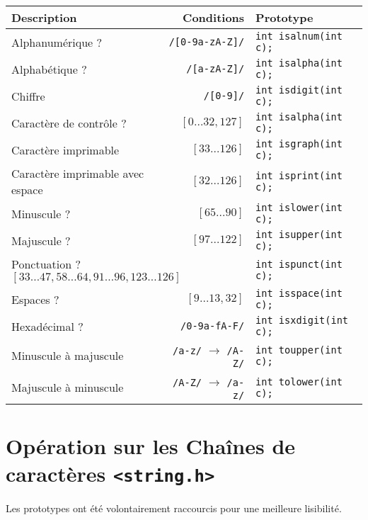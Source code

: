 \documentclass{article}
\newcommand{\cd}{\lstinline}
\begin{document}
\begin{multicols*}{3}
\begin{tabularx}{\linewidth}{Xrl}
  \bf Description         & Conditions             & Prototype \\
  \hline
  Alphanumérique ?        & \texttt{/[0-9a-zA-Z]/} & \cd{int isalnum(int c);} \\
  Alphabétique ?          & \texttt{/[a-zA-Z]/} & \cd{int isalpha(int c);} \\
  Chiffre                 & \texttt{/[0-9]/} & \cd{int isdigit(int c);} \\
  Caractère de contrôle ? & \footnotesize $[0\dots32, 127]$  & \cd{int isalpha(int c);} \\
  Caractère imprimable    & \footnotesize $[33\dots 126]$ & \cd{int isgraph(int c);} \\
  Caractère imprimable avec espace & \footnotesize$[32\dots 126]$ & \cd{int isprint(int c);} \\
  Minuscule ?             & \footnotesize $[65\dots 90]$ & \cd{int islower(int c);} \\
  Majuscule ?             & \footnotesize $[97\dots 122]$ & \cd{int isupper(int c);} \\
  \multicolumn{2}{l}{Ponctuation ? \hfill\footnotesize $[33\dots 47, 58\dots64, 91\dots96, 123\dots126]$} & \cd{int ispunct(int c);} \\
  Espaces ?               & \footnotesize $[9\dots13,32]$ & \cd{int isspace(int c);} \\
  Hexadécimal ?           & \texttt{/0-9a-fA-F/} &  \cd{int isxdigit(int c);} \\
  \hline
  Minuscule à majuscule & \texttt{/a-z/} $\to$ \texttt{/A-Z/} & \cd{int toupper(int c);} \\
  Majuscule à minuscule & \texttt{/A-Z/} $\to$ \texttt{/a-z/} & \cd{int tolower(int c);} \\
\end{tabularx}

\section*{Opération sur les Chaînes de caractères \texttt{<string.h>}}
Les prototypes ont été volontairement raccourcis pour une meilleure lisibilité.


\end{multicols*}
\end{document}
